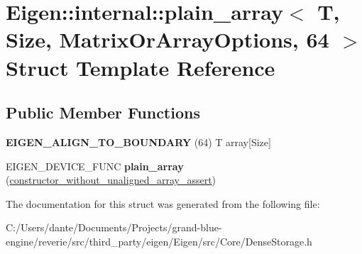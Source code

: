 \hypertarget{struct_eigen_1_1internal_1_1plain__array_3_01_t_00_01_size_00_01_matrix_or_array_options_00_0164_01_4}{}\section{Eigen\+::internal\+::plain\+\_\+array$<$ T, Size, Matrix\+Or\+Array\+Options, 64 $>$ Struct Template Reference}
\label{struct_eigen_1_1internal_1_1plain__array_3_01_t_00_01_size_00_01_matrix_or_array_options_00_0164_01_4}
\subsection*{Public Member Functions}
\begin{DoxyCompactItemize}
\item 
\mbox{\label{struct_eigen_1_1internal_1_1plain__array_3_01_t_00_01_size_00_01_matrix_or_array_options_00_0164_01_4_a1b0b69403eed325c842313e7455ee6f1}} 
{\bfseries E\+I\+G\+E\+N\+\_\+\+A\+L\+I\+G\+N\+\_\+\+T\+O\+\_\+\+B\+O\+U\+N\+D\+A\+RY} (64) T array\mbox{[}Size\mbox{]}
\item 
\mbox{\label{struct_eigen_1_1internal_1_1plain__array_3_01_t_00_01_size_00_01_matrix_or_array_options_00_0164_01_4_ac4ddae4456c81464d78b8df4852b485e}} 
E\+I\+G\+E\+N\+\_\+\+D\+E\+V\+I\+C\+E\+\_\+\+F\+U\+NC {\bfseries plain\+\_\+array} (\mbox{\hyperlink{struct_eigen_1_1internal_1_1constructor__without__unaligned__array__assert}{constructor\+\_\+without\+\_\+unaligned\+\_\+array\+\_\+assert}})
\end{DoxyCompactItemize}


The documentation for this struct was generated from the following file\+:\begin{DoxyCompactItemize}
\item 
C\+:/\+Users/dante/\+Documents/\+Projects/grand-\/blue-\/engine/reverie/src/third\+\_\+party/eigen/\+Eigen/src/\+Core/Dense\+Storage.\+h\end{DoxyCompactItemize}
